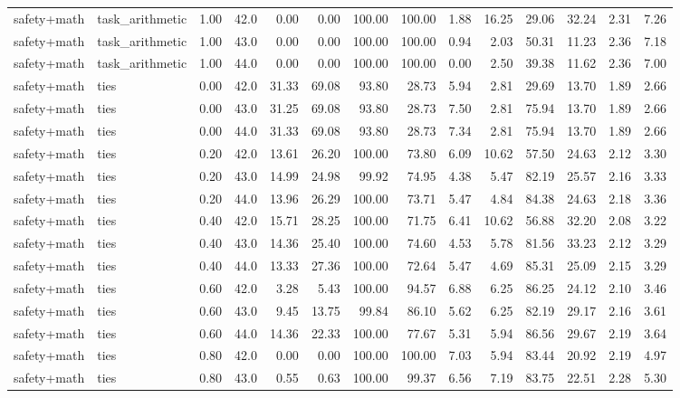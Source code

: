 \documentclass{article}
\begin{document}
\begin{table}[H]
{\begin{tabular}{llllrrrrrrrrrr}
safety+math & task\_arithmetic & 1.00 & 42.0 & 0.00 & 0.00 & 100.00 & 100.00 & 1.88 & 16.25 & 29.06 & 32.24 & 2.31 & 7.26 \\
safety+math & task\_arithmetic & 1.00 & 43.0 & 0.00 & 0.00 & 100.00 & 100.00 & 0.94 & 2.03 & 50.31 & 11.23 & 2.36 & 7.18 \\
safety+math & task\_arithmetic & 1.00 & 44.0 & 0.00 & 0.00 & 100.00 & 100.00 & 0.00 & 2.50 & 39.38 & 11.62 & 2.36 & 7.00 \\
safety+math & ties & 0.00 & 42.0 & 31.33 & 69.08 & 93.80 & 28.73 & 5.94 & 2.81 & 29.69 & 13.70 & 1.89 & 2.66 \\
safety+math & ties & 0.00 & 43.0 & 31.25 & 69.08 & 93.80 & 28.73 & 7.50 & 2.81 & 75.94 & 13.70 & 1.89 & 2.66 \\
safety+math & ties & 0.00 & 44.0 & 31.33 & 69.08 & 93.80 & 28.73 & 7.34 & 2.81 & 75.94 & 13.70 & 1.89 & 2.66 \\
safety+math & ties & 0.20 & 42.0 & 13.61 & 26.20 & 100.00 & 73.80 & 6.09 & 10.62 & 57.50 & 24.63 & 2.12 & 3.30 \\
safety+math & ties & 0.20 & 43.0 & 14.99 & 24.98 & 99.92 & 74.95 & 4.38 & 5.47 & 82.19 & 25.57 & 2.16 & 3.33 \\
safety+math & ties & 0.20 & 44.0 & 13.96 & 26.29 & 100.00 & 73.71 & 5.47 & 4.84 & 84.38 & 24.63 & 2.18 & 3.36 \\
safety+math & ties & 0.40 & 42.0 & 15.71 & 28.25 & 100.00 & 71.75 & 6.41 & 10.62 & 56.88 & 32.20 & 2.08 & 3.22 \\
safety+math & ties & 0.40 & 43.0 & 14.36 & 25.40 & 100.00 & 74.60 & 4.53 & 5.78 & 81.56 & 33.23 & 2.12 & 3.29 \\
safety+math & ties & 0.40 & 44.0 & 13.33 & 27.36 & 100.00 & 72.64 & 5.47 & 4.69 & 85.31 & 25.09 & 2.15 & 3.29 \\
safety+math & ties & 0.60 & 42.0 & 3.28 & 5.43 & 100.00 & 94.57 & 6.88 & 6.25 & 86.25 & 24.12 & 2.10 & 3.46 \\
safety+math & ties & 0.60 & 43.0 & 9.45 & 13.75 & 99.84 & 86.10 & 5.62 & 6.25 & 82.19 & 29.17 & 2.16 & 3.61 \\
safety+math & ties & 0.60 & 44.0 & 14.36 & 22.33 & 100.00 & 77.67 & 5.31 & 5.94 & 86.56 & 29.67 & 2.19 & 3.64 \\
safety+math & ties & 0.80 & 42.0 & 0.00 & 0.00 & 100.00 & 100.00 & 7.03 & 5.94 & 83.44 & 20.92 & 2.19 & 4.97 \\
safety+math & ties & 0.80 & 43.0 & 0.55 & 0.63 & 100.00 & 99.37 & 6.56 & 7.19 & 83.75 & 22.51 & 2.28 & 5.30 \\

\end{tabular}}
\end{table}
\end{document}
